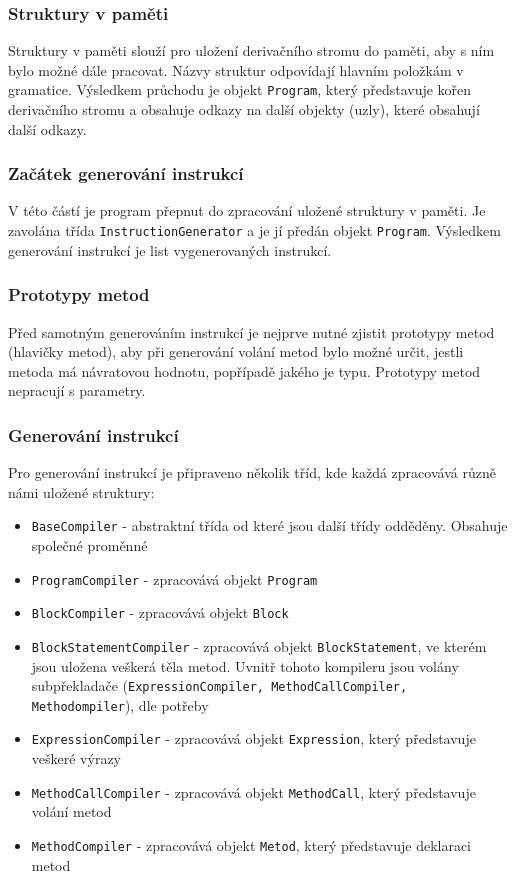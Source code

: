 \documentclass[12pt, a4paper]{article}
\begin{document}
\subsubsection{Struktury v paměti}
\noindent Struktury v paměti slouží pro uložení derivačního stromu do paměti, aby s ním bylo možné dále pracovat. Názvy struktur odpovídají hlavním položkám v gramatice. Výsledkem průchodu je objekt \texttt{Program}, který představuje kořen derivačního stromu a obsahuje odkazy na další objekty (uzly), které obsahují další odkazy.

\subsubsection{Začátek generování instrukcí}
\noindent V této částí je program přepnut do zpracování uložené struktury v paměti. Je zavolána třída \texttt{InstructionGenerator} a je jí předán objekt \texttt{Program}. Výsledkem generování instrukcí je list vygenerovaných instrukcí.

\subsubsection{Prototypy metod}
\noindent Před samotným generováním instrukcí je nejprve nutné zjistit prototypy metod (hlavičky metod), aby při generování volání metod bylo možné určit, jestli metoda má návratovou hodnotu, popřípadě jakého je typu. Prototypy metod nepracují s parametry.

\subsubsection{Generování instrukcí}
\noindent Pro generování instrukcí je připraveno několik tříd, kde každá zpracovává různě námi uložené struktury:
\begin{itemize}
	\item \texttt{BaseCompiler} - abstraktní třída od které jsou další třídy odděděny. Obsahuje společné proměnné
	\item \texttt{ProgramCompiler} - zpracovává objekt \texttt{Program}
	\item \texttt{BlockCompiler} - zpracovává objekt \texttt{Block}
	\item \texttt{BlockStatementCompiler} - zpracovává objekt \texttt{BlockStatement}, ve kterém jsou uložena veškerá těla metod. Uvnitř tohoto kompileru jsou volány subpřekladače (\texttt{ExpressionCompiler, MethodCallCompiler, \newline Methodompiler}), dle potřeby
	\item \texttt{ExpressionCompiler} - zpracovává objekt \texttt{Expression}, který představuje veškeré výrazy
	\item \texttt{MethodCallCompiler} - zpracovává objekt \texttt{MethodCall}, který představuje volání metod
	\item \texttt{MethodCompiler} - zpracovává objekt \texttt{Metod}, který představuje deklaraci metod
\end{itemize}
\end{document}
